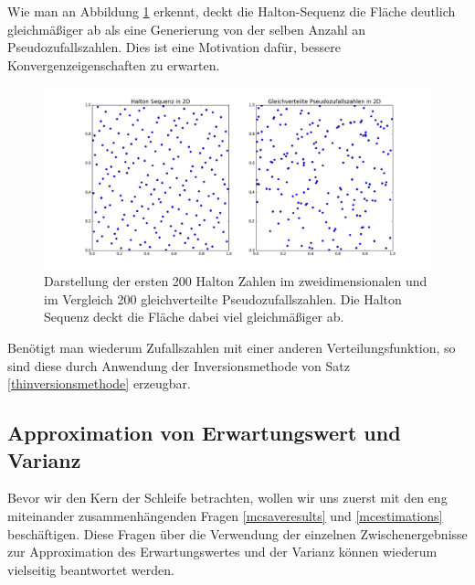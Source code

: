 Wie man an Abbildung \ref{fig:halton_numbers} erkennt, deckt die Halton-Sequenz die Fläche deutlich gleichmäßiger ab als eine Generierung von der selben Anzahl an Pseudozufallszahlen. Dies ist eine Motivation dafür, bessere Konvergenzeigenschaften zu erwarten.
\begin{figure}
\includegraphics[width=\textwidth]{Figures/halton_numbers.png}
\caption{Darstellung der ersten 200 Halton Zahlen im zweidimensionalen und im Vergleich 200 gleichverteilte Pseudozufallszahlen. Die Halton Sequenz deckt die Fläche dabei viel gleichmäßiger ab.}
\label{fig:halton_numbers}
\end{figure}
Benötigt man wiederum Zufallszahlen mit einer anderen Verteilungsfunktion, so sind diese durch Anwendung der Inversionsmethode von Satz \ref{thinversionsmethode} erzeugbar.

\subsection{Approximation von Erwartungswert und Varianz}
Bevor wir den Kern der Schleife betrachten, wollen wir uns zuerst mit den eng miteinander zusammenhängenden Fragen \ref{mcsaveresults} und \ref{mcestimations} beschäftigen. Diese Fragen über die Verwendung der einzelnen Zwischenergebnisse zur Approximation des Erwartungswertes und der Varianz können wiederum vielseitig beantwortet werden.
